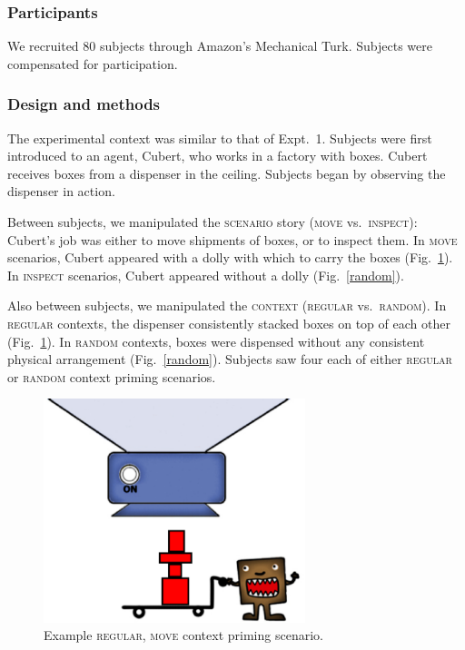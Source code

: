 \documentclass[linguex]{sp}
\begin{document}
\subsubsection{Participants}

We recruited 80 subjects through Amazon's Mechanical Turk. Subjects were compensated for participation.

\subsubsection{Design and methods}

The experimental context was similar to that of Expt.~1. Subjects were first introduced to an agent, Cubert, who works in a factory with boxes. Cubert receives boxes from a dispenser in the ceiling. Subjects began by observing the dispenser in action.

Between subjects, we manipulated the \textsc{scenario} story (\textsc{move} vs.\ \textsc{inspect}): Cubert's job was either to move shipments of boxes, or to inspect them. In \textsc{move} scenarios, Cubert appeared with a dolly with which to carry the boxes (Fig.\ \ref{regular}). In \textsc{inspect} scenarios, Cubert appeared without a dolly (Fig.\ \ref{random}).

Also between subjects, we manipulated the \textsc{context} (\textsc{regular} vs.\ \textsc{random}). In \textsc{regular} contexts, the dispenser consistently stacked boxes on top of each other (Fig.\ \ref{regular}). In \textsc{random} contexts, boxes were dispensed without any consistent physical arrangement (Fig.\ \ref{random}). Subjects saw four each of either \textsc{regular} or \textsc{random} context priming scenarios.

\begin{figure}[h]
\centering
\includegraphics[width=3in]{images/context13reg.eps}
\caption{Example \textsc{regular}, \textsc{move} context priming scenario.}\label{regular}
\end{figure}
\end{document}
